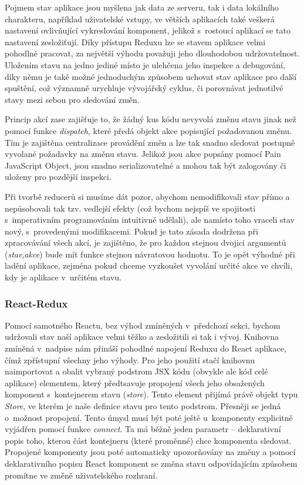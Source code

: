 Pojmem stav aplikace jsou myšlena jak data ze serveru, tak i data lokálního charakteru, například uživatelské vstupy, ve větších aplikacích také veškerá nastavení ovlivňující vykreslování komponent, jelikož s~rostoucí aplikací se tato nastavení zesložiťují. Díky přístupu Reduxu lze se stavem aplikace velmi pohodlně pracovat, za největší výhodu považuji jeho dlouhodobou udržovatelnost. Uložením stavu na jedno jediné místo je ulehčena jeho inspekce a debugování, díky němu je také možné jednoduchým způsobem uchovat stav aplikace pro další spuštění, což významně urychluje vývojářský cyklus, či porovnávat jednotilvé stavy mezi sebou pro sledování změn. 

Princip akcí zase zajišťuje to, že žádný kus kódu nevyvolá změnu stavu jinak než pomocí funkce \textit{dispatch}, které předá objekt akce popisující požadovanou změnu. Tím je zajištěna centralizace provádění změn a lze tak snadno sledovat postupně vyvolané požadavky na změnu stavu. Jelikož jsou akce popsány pomocí Pain JavaScript Object, jsou snadno serializovatelné a mohou tak být zalogovány či uloženy pro pozdější inspekci. 

Při tvorbě reducerů si musíme dát pozor, abychom nemodifikovali stav přímo a nepůsobovali tak tzv. vedlejší efekty (což bychom nejspíš ve spojitosti s~imperativním programováním intuitivně udělali), ale namísto toho vraceli stav nový, s~provedenými modifikacemi. Pokud je tato zásada dodržena při zpracovávání všech akcí, je zajištěno, že pro každou stejnou dvojici argumentů (\textit{stav},\textit{akce}) bude mít funkce stejnou návratovou hodnotu. To je opět výhodné při ladění aplikace, zejména pokud chceme vyzkoušet vyvolání určité akce ve chvíli, kdy je aplikace v~určitém stavu.

\subsubsection{React-Redux}
Pomocí samotného Reactu, bez výhod zmíněných v~předchozí sekci, bychom udržovali stav naší aplikace velmi těžko a zesložitili si tak i vývoj. Knihovna zmíněná v~nadpise nám přináší pohodlné napojení Reduxu do React aplikace, čímž zpřístupní všechny jeho výhody. Pro jeho použití stačí knihovnu naimportovat a obalit vybraný podstrom JSX kódu (obvykle ale kód celé aplikace) elementem, který předtsavuje propojení všech jeho obsažených komponent s~kontejnerem stavu (\textit{store}). Tento element přijímá právě objekt typu \textit{Store}, ve kterém je naše definice stavu pro tento podstrom. Přesněji se jedná o~možnost propojení. Tento úmysl musí být poté ještě u~komponenty explicitně vyjádřen pomocí funkce \textit{connect}. Ta má běžně jeden parametr -- deklarativní popis toho, kterou část kontejneru (které proměnné) chce komponenta sledovat. Propojené komponenty jsou poté automaticky upozorňovány na změny a pomocí deklarativního popisu React komponent se změna stavu odpovídajícím způsobem promítne ve změně uživatelského rozhraní.

